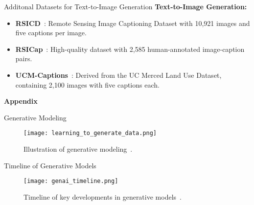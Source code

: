 \begin{refsection}
  \begin{frame}{Additonal Datasets for Text-to-Image Generation}
    \textbf{Text-to-Image Generation:}
    \begin{itemize}
      \item \textbf{RSICD}~\parencite{lu2017exploring}: Remote Sensing Image Captioning Dataset with 10,921 images and five captions per image.
      \item \textbf{RSICap}~\parencite{hu2023rsgpt}: High-quality dataset with 2,585 human-annotated image-caption pairs.
      \item \textbf{UCM-Captions}~\parencite{qu2016deep}: Derived from the UC Merced Land Use Dataset, containing 2,100 images with five captions each.
    \end{itemize}
    \bottomleftrefs
  \end{frame}
\end{refsection}

\begin{refsection}
  \begin{frame}[plain]
    \vfill
    \centering
    {\Huge \textbf{Appendix}}
    \vfill
  \end{frame}
\end{refsection}

\begin{refsection}
  \begin{frame}{Generative Modeling}
    \begin{figure}
      \centering
      \texttt{[image: learning\_to\_generate\_data.png]}
      \caption{\scriptsize Illustration of generative modeling~\parencite{CVPR2023Tutorial}.}
    \end{figure}
    \bottomleftrefs
  \end{frame}
  \end{refsection}
  
  \begin{refsection}
  \begin{frame}{Timeline of Generative Models}
    \begin{figure}
      \centering
      \texttt{[image: genai\_timeline.png]}
      \caption{\scriptsize Timeline of key developments in generative models~\parencite{dengPPTAdvancedNueralNetwork2024}.}
    \end{figure}
    \bottomleftrefs
  \end{frame}
  \end{refsection}
  

